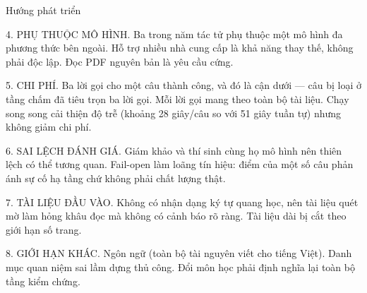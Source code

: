 \documentclass[aspectratio=169,11pt]{beamer}
\begin{document}
\begin{frame}{Hướng phát triển}
{    4. PHỤ THUỘC MÔ HÌNH. Ba trong năm tác tử phụ thuộc một mô hình đa phương thức bên ngoài. Hỗ trợ nhiều nhà cung cấp là khả năng thay thế, không phải độc lập. Đọc PDF nguyên bản là yêu cầu cứng.

    5. CHI PHÍ. Ba lời gọi cho một câu thành công, và đó là cận dưới --- câu bị loại ở tầng chấm đã tiêu trọn ba lời gọi. Mỗi lời gọi mang theo toàn bộ tài liệu. Chạy song song cải thiện độ trễ (khoảng 28 giây/câu so với 51 giây tuần tự) nhưng không giảm chi phí.

    6. SAI LỆCH ĐÁNH GIÁ. Giám khảo và thí sinh cùng họ mô hình nên thiên lệch có thể tương quan. Fail-open làm loãng tín hiệu: điểm của một số câu phản ánh sự cố hạ tầng chứ không phải chất lượng thật.

    7. TÀI LIỆU ĐẦU VÀO. Không có nhận dạng ký tự quang học, nên tài liệu quét mờ làm hỏng khâu đọc mà không có cảnh báo rõ ràng. Tài liệu dài bị cắt theo giới hạn số trang.

    8. GIỚI HẠN KHÁC. Ngôn ngữ (toàn bộ tài nguyên viết cho tiếng Việt). Danh mục quan niệm sai lầm dựng thủ công. Đổi môn học phải định nghĩa lại toàn bộ tầng kiểm chứng.
  }
\end{frame}

\end{document}
